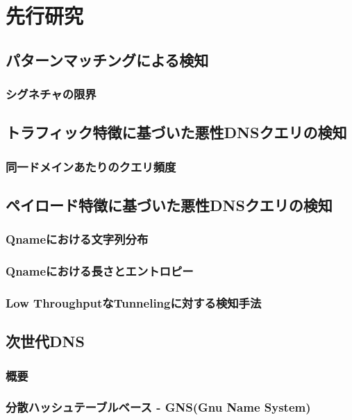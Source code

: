 \documentclass[12pt]{jarticle} %
\begin{document}
\newpage
\section{先行研究}
\subsection{パターンマッチングによる検知}
\subsubsection{シグネチャの限界}
\subsection{トラフィック特徴に基づいた悪性DNSクエリの検知}
\subsubsection{同一ドメインあたりのクエリ頻度}
\subsection{ペイロード特徴に基づいた悪性DNSクエリの検知}
\subsubsection{Qnameにおける文字列分布}
\subsubsection{Qnameにおける長さとエントロピー}
\subsubsection{Low ThroughputなTunnelingに対する検知手法}
\subsection{次世代DNS}
\subsubsection{概要}
\subsubsection{分散ハッシュテーブルベース - GNS(Gnu Name System)}
\end{document}
